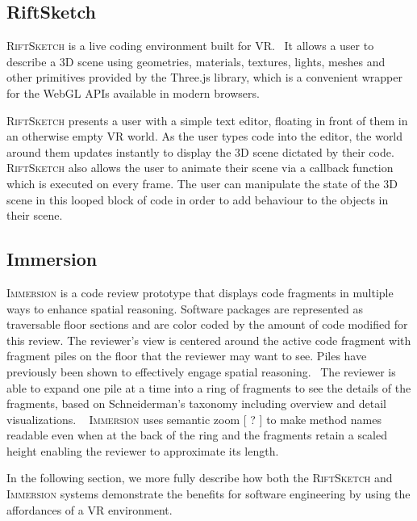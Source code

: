 \documentclass[conference]{IEEEtran}
\begin{document}
\subsection{RiftSketch}

\textsc{RiftSketch} is a live coding environment built for VR.~\cite{Peiris:RiftSketchVideo}
It allows a user to describe a 3D scene using geometries, materials, textures, lights, meshes and other primitives provided by the Three.js library, which is a convenient wrapper for the WebGL APIs available in modern browsers. 

\textsc{RiftSketch} presents a user with a simple text editor, floating in front of them in an otherwise empty VR world. 
As the user types code into the editor, the world around them updates instantly to display the 3D scene dictated by their code. 
\textsc{RiftSketch} also allows the user to animate their scene via a callback function which is executed on every frame. 
The user can manipulate the state of the 3D scene in this looped block of code in order to add behaviour to the objects in their scene.


\subsection{Immersion}

\textsc{Immersion} is a code review prototype that displays code fragments in multiple ways to enhance spatial reasoning.
Software packages are represented as traversable floor sections and are color coded by the amount of code modified for this review.
The reviewer's view is centered around the active code fragment with fragment piles on the floor that the reviewer may want to see.
Piles have previously been shown to effectively engage spatial reasoning.~\cite{Agarawala:BumpTop}
The reviewer is able to expand one pile at a time into a ring of fragments to see the details of the fragments, based on Schneiderman's taxonomy including overview and detail visualizations. ~\cite{Shneiderman:InfoVisTaxonomy}
\textsc{Immersion} uses semantic zoom [ ? ] to make method names readable even when at the back of the ring and the fragments retain a scaled height enabling the reviewer to approximate its length. 

In the following section, we more fully describe how both the \textsc{RiftSketch} and \textsc{Immersion} systems demonstrate the benefits for software engineering by using the affordances of a VR environment.
\end{document}
